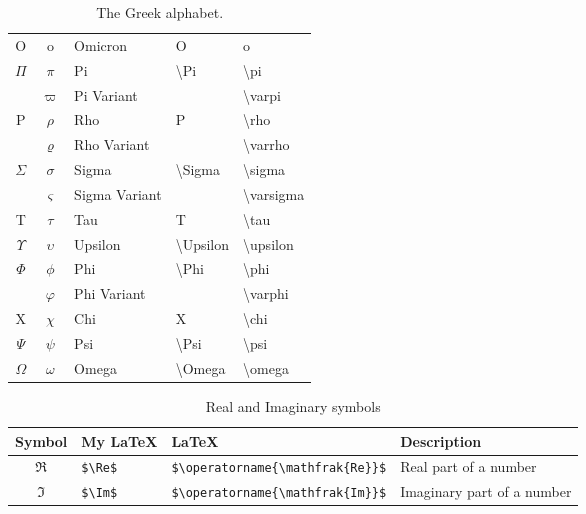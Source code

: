 \begin{table}[!htb]
\begin{tabularx}{\linewidth}{ c c l l l }
  O               & o             & Omicron         & O                      & o \\
  $\Pi$           & $\pi$         & Pi              & \textbackslash Pi      & \textbackslash pi \\
                  & $\varpi$      & Pi Variant      &                        & \textbackslash varpi \\
  P               & $\rho$        & Rho             & P                      & \textbackslash rho \\
                  & $\varrho$     & Rho Variant     &                        & \textbackslash varrho \\
  $\Sigma$        & $\sigma$      & Sigma           & \textbackslash Sigma   & \textbackslash sigma \\
                  & $\varsigma$   & Sigma Variant   &                        & \textbackslash varsigma \\
  T               & $\tau$        & Tau             & T                      & \textbackslash tau \\
  $\Upsilon$      & $\upsilon$    & Upsilon         & \textbackslash Upsilon & \textbackslash upsilon \\
  $\Phi$          & $\phi$        & Phi             & \textbackslash Phi     & \textbackslash phi \\
                  & $\varphi$     & Phi Variant     &                        & \textbackslash varphi \\
  X               & $\chi$        & Chi             & X                      & \textbackslash chi \\
  $\Psi$          & $\psi$        & Psi             & \textbackslash Psi     & \textbackslash psi \\
  $\Omega$        & $\omega$      & Omega           & \textbackslash Omega   & \textbackslash omega    
\end{tabularx}
\caption{The Greek alphabet.}
\label{tab:GreekAlphabet}
\end{table}

\begin{table}[!htb]
\begin{tabularx}{\linewidth}{ c l l l } \hline
  Symbol & My \LaTeX & \LaTeX & Description \\
  \hline
  $\Re$ & \texttt{\$\textbackslash Re\$} & \texttt{\$\textbackslash operatorname\{\textbackslash mathfrak\{Re\}\}\$} & Real part of a number \\
  $\Im$ & \texttt{\$\textbackslash Im\$} & \texttt{\$\textbackslash operatorname\{\textbackslash mathfrak\{Im\}\}\$} & Imaginary part of a number
\end{tabularx}
\caption{Real and Imaginary symbols}
\label{tab:RealImaginarySymbols}
\end{table}